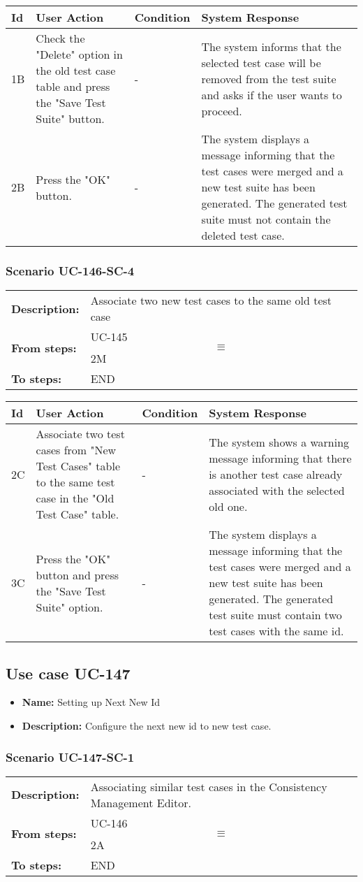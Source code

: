 \documentclass[a4paper,11pt]{article}
\newcommand{\bl}{\\ \hline}
\begin{document}
\begin{tabular}{|p{0.8in}|p{1.6in}|p{1.6in}|p{1.6in}|}
\hline
Id & User Action & Condition & System Response  \bl 
1B & Check the "Delete" option  in the old test case table and press the "Save Test Suite" button. & - & The system informs that the selected test case will be removed from the test suite and asks if the user wants to proceed. \bl 
2B & Press the "OK" button. & - & The system displays a message informing that the test cases were merged and a new test suite has been generated. The generated test suite must not contain the deleted test case. \bl 
\end{tabular}
\subsubsection*{Scenario UC-146-SC-4}
\begin{tabular}{p{1in}p{4in}}
{\bf Description:} & Associate two new test cases to the same old test case \\
{\bf From steps:} & UC-145$$\equiv$$2M \\
{\bf To steps:} & END \\
\end{tabular}
 
\begin{tabular}{|p{0.8in}|p{1.6in}|p{1.6in}|p{1.6in}|}
\hline
Id & User Action & Condition & System Response  \bl 
2C & Associate two test cases from "New Test Cases" table to the same test case in the "Old Test Case" table. & - & The system shows a warning message informing that there is another test case already associated with the selected old one. \bl 
3C & Press the "OK" button and press the "Save Test Suite" option. & - & The system displays a message informing that the test cases were merged and a new test suite has been generated. The generated test suite must contain two test cases with the same id. \bl 
\end{tabular}
\subsection*{Use case UC-147}
\begin{itemize}
\item {\bf Name: }Setting up Next New Id
\item {\bf Description: }Configure the next new id to new test case.
\end{itemize}
\subsubsection*{Scenario UC-147-SC-1}
\begin{tabular}{p{1in}p{4in}}
{\bf Description:} & Associating similar test cases in the Consistency Management Editor. \\
{\bf From steps:} & UC-146$$\equiv$$2A \\
{\bf To steps:} & END \\
\end{tabular}
 
\end{document}
